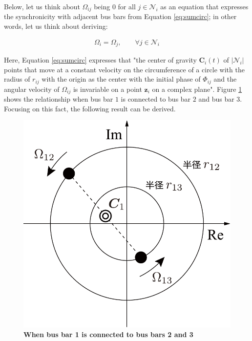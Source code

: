 \documentclass[graybox, envcountchap]{svmult}
\begin{document}
Below, let us think about $\Omega_{ij}$ being 0 for all $j\in \mathcal{N}_i$ as an equation that expresses the synchronicity with adjacent bus bars from Equation \ref{eq:sumcirc};
in other words, let us think about deriving: 

\begin{align}\label{eq:alloms}
\Omega_i = \Omega_{j} 
,\qquad 
\forall j\in \mathcal{N}_i
\end{align}

Here, Equation \ref{eq:sumcirc} expresses that "the center of gravity $\bm{C}_i (t)$ of $|\mathcal{N}_i|$ points that move at a constant velocity on the circumference of a circle with the radius of $r_{ij}$ with the origin as the center with the initial phase of $\Phi_{ij}$ and the angular velocity of $\Omega_{ij}$ is invariable on a point $\bm{z}_i$ on a complex plane".
Figure \ref{fig:centerg} shows the relationship when bus bar $1$ is connected to bus bar $2$ and bus bar $3$. Focusing on this fact, the following result can be derived.

\begin{figure}[t]
\centering
\includegraphics[width = .4\linewidth]{figs/centerg}
\medskip
\caption{\textbf{When bus bar 1 is connected to bus bars 2 and 3}}
\label{fig:centerg}
\medskip
\end{figure}
\end{document}
